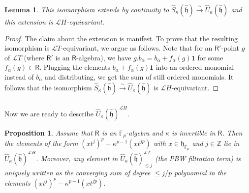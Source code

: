 \documentclass{amsart}
\newtheorem{Prop}[Thm]{Proposition}
\newtheorem{Lem}[Thm]{Lemma}
\theoremstyle{definition}
\newcommand{\sss}{\subsubsection{}}
\newcommand{\Ring}{\mathsf{R}}
\newcommand{\h}{\mathfrak{h}}
\newcommand{\hh}{\hat{\mathfrak{h}}}
\newcommand{\F}{\mathbb{F}}
\newcommand{\Z}{\mathbb{Z}}
\newcommand{\Loop}{\mathscr{L}}
\numberwithin{equation}{section}
\begin{document}
\begin{Lem}\label{Lem:abel_iso_equiv}
This isomorphism extends by continuity to $\widehat{S}_\kappa(\hh)\xrightarrow{\sim} \widehat{U}_\kappa(\hh)$ and this extension is $\Loop H$-equivariant.   
\end{Lem}
\begin{proof}
The claim about the extension is manifest. To prove that the resulting isomorphism is $\Loop T$-equivariant, we argue as follows. Note that for an $\Ring'$-point $g$ of $\Loop T$ (where $\Ring'$ is an $\Ring$-algebra), we have $g.b_\alpha=b_\alpha+f_\alpha(g)\mathbf{1}$
for some $f_\alpha(g)\in \Ring$. Plugging the elements $b_\alpha+f_\alpha(g)\mathbf{1}$ into an ordered monomial instead of $b_\alpha$ and distributing, we get the sum of still ordered monomials. It follows that the isomorphism 
$\widehat{S}_\kappa(\hh)\xrightarrow{\sim} \widehat{U}_\kappa(\hh)$ is $\Loop H$-equivariant.
\end{proof}

\sss Now we are ready to describe $\widehat{U}_\kappa(\hh)^{\Loop H}$.
\begin{Prop}\label{Prop:HC_center_abelian}
Assume that $\Ring$ is an $\F_p$-algebra and $\kappa$ is invertible in $\Ring$. 
Then the elements of the form 
$(xt^j)^p-\kappa^{p-1}(xt^{jp})$ with $x\in \h_{\F_p}$ and $j\in \Z$
lie in $\widehat{U}_\kappa(\hh)^{\Loop H}$. Moreover, any element in  $\widehat{U}_\kappa(\hat{\h})^{\Loop T}_{\leqslant j}$
(the PBW filtration term) is uniquely written as the converging sum of degree $\leqslant j/p$ polynomial in the elements $(xt^j)^p-\kappa^{p-1}(xt^{jp})$.
\end{Prop}

\end{document}
